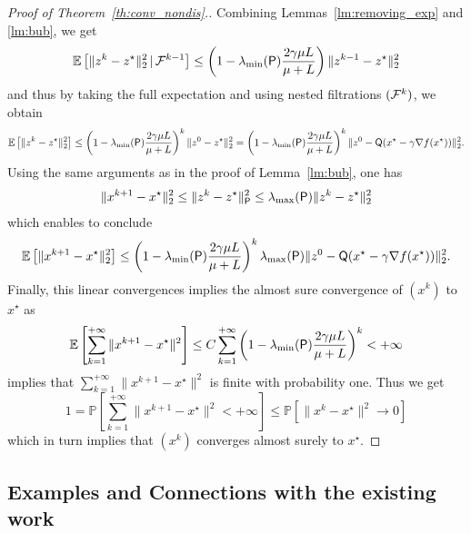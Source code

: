 \begin{proof}[Proof of Theorem~\ref{th:conv_nondis}.]
Combining Lemmas~\ref{lm:removing_exp} and \ref{lm:bub}, we get
\begin{align*}
    \mathbb{E}\left[\|z^{k} - z^\star\|_2^2\,|\,\mathcal{F}^{k-1}\right] \leq \left(1 - \lambda_{\min}({\mathsf{P}})\frac{2\gamma\mu L}{\mu + L}\right)\|z^{k-1}-z^\star\|_2^2
\end{align*}
and thus by taking the full expectation and using nested filtrations $(\mathcal{F}^k)$, we obtain
\begin{equation*}%
    \EE\left[\|z^{k} - z^\star\|_2^2\right] \leq \left(1 - \lambda_{\min}(\bP)\frac{2\gamma\mu L}{\mu + L}\right)^k\|z^0-z^\star\|_2^2 = \left(1 - \lambda_{\min}(\bP)\frac{2\gamma\mu L}{\mu + L}\right)^k\|z^0-\bQ(x^\star - \gamma\nabla f(x^\star))\|_2^2.
\end{equation*}
Using the same arguments as in the proof of Lemma~\ref{lm:bub}, one has
\begin{align*}
  \|x^{k+1}-x^\star\|_2^2 \leq  \|z^k-z^\star\|_{{\mathsf{P}}}^2 \leq \lambda_{\max}({\mathsf{P}})\|z^k-z^\star\|_2^2
\end{align*}
which enables to conclude 
\begin{equation*}
    \mathbb{E}\left[\|x^{k+1}-x^\star\|_2^2\right] \leq \left(1 - \lambda_{\min}({\mathsf{P}})\frac{2\gamma\mu L}{\mu + L}\right)^k \lambda_{\max}({\mathsf{P}}) \|z^0-{\mathsf{Q}}(x^\star - \gamma\nabla f(x^\star))\|_2^2.
\end{equation*}
Finally, this linear convergences implies the almost sure convergence of $(x^k)$ to $x^\star$ as 
\begin{equation*}
    \mathbb{E}\left[ \sum_{k=1}^{+\infty}  \|x^{k+1} - x^\star \|^2 \right]\leq C \sum_{k=1}^{+\infty}\left(1-\lambda_{\min}({\mathsf{P}})\frac{2\gamma\mu L}{\mu + L}\right)^k < +\infty
\end{equation*}
implies that $ \sum_{k=1}^{+\infty}  \|x^{k+1} - x^\star \|^2$ is finite with probability one. Thus we get
\[
1 = \mathbb{P}\left[ \sum_{k=1}^{+\infty}  \|x^{k+1} - x^\star \|^2 < +\infty \right] \leq \mathbb{P}\left[ \|x^k - x^\star \|^2 \to 0 \right]
\]
which in turn implies that $(x^k)$ converges almost surely to $x^\star$.
\end{proof}

\subsection{Examples and Connections with the existing work}\label{sec:comparison}
 
